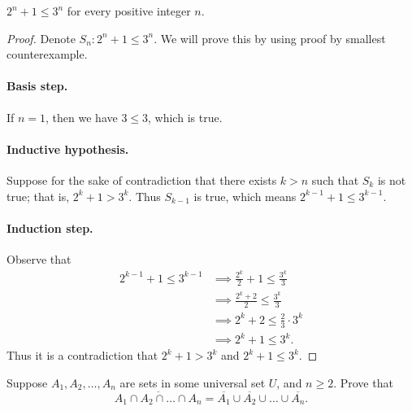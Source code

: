 \documentclass{exam}
\begin{document}
\begin{proposition}{10.16}
    $2^n+1\le3^n$ for every positive integer $n$.
\end{proposition}

\begin{proof}
    Denote $S_n:2^n+1\le3^n$. We will prove this by using proof by smallest counterexample.
    \paragraph{Basis step.} If $n=1$, then we have $3\le3$, which is true.
    \paragraph{Inductive hypothesis.} Suppose for the sake of contradiction that there exists $k>n$ such that $S_k$ is not true; that is, $2^k + 1 > 3^k$. Thus $S_{k-1}$ is true, which means $2^{k-1}+1\le3^{k-1}$.
    \paragraph{Induction step.} Observe that
    \begin{align*}
        2^{k-1}+1\le3^{k-1}&\implies\frac{2^k}2+1\le\frac{3^k}3\\
        &\implies\frac{2^k+2}2\le\frac{3^k}3\\
        &\implies2^k+2\le\frac23\cdot3^k\\
        &\implies2^k+1\le3^k.
    \end{align*}
    Thus it is a contradiction that $2^k+1>3^k$ and $2^k+1\le3^k$.
\end{proof}

\begin{proposition}{10.17}
    Suppose $A_1, A_2,\dots,A_n$ are sets in some universal set $U$, and $n\ge2$. Prove that $$\overline{A_1\cap A_2\cap\dots\cap A_n}=\overline{A_1}\cup\overline{A_2}\cup\dots\cup\overline{A_n}.$$
\end{proposition}
\end{document}
